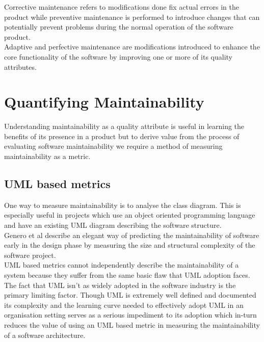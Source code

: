 \documentclass[dvips,12pt]{article}
\begin{document}
Corrective maintenance refers to modifications done fix actual errors in the product while preventive maintenance is performed to introduce changes that can potentially prevent problems during the normal operation of the software product. \\

Adaptive and perfective maintenance are modifications introduced to enhance the core functionality of the software by improving one or more of its quality attributes. 

\section{Quantifying Maintainability}
Understanding maintainability as a quality attribute is useful in learning the benefits of  its presence in a product but to derive value from the process of evaluating software maintainability we require a method of measuring maintainability as a metric.

\subsection{UML based metrics}
One way to measure maintainability is to analyse the class diagram. This is especially useful in projects which use an object oriented programming language and have an existing UML diagram describing the software structure. \\


Genero et al \cite{genero_building_2003} \cite{genero_building_2007} describe an elegant way of predicting the maintainability of software early in the design phase by measuring the size and structural complexity of the software project. \\

UML based metrics cannot independently describe the maintainability of a system because they suffer from the same basic flaw that UML adoption faces. The fact that UML isn't as widely adopted in the software industry is the primary limiting factor. Though UML is extremely well defined and documented its complexity and the learning curve needed to effectively adopt UML in an organisation setting serves as a serious impediment to its adoption which in-turn reduces the value of using an UML based metric in measuring the maintainability of a software architecture.
\end{document}
